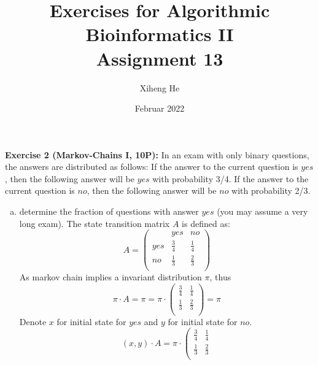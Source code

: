 \documentclass[12pt]{article}
\title{Exercises for Algorithmic Bioinformatics II\\
Assignment 13}
\author{Xiheng He}
\date{Februar 2022}
\begin{document}
{\let\newpage\relax\maketitle}
\begin{flushleft}
\textbf{Exercise 2 (Markov-Chains I, 10P):}
\newline
In an exam with only binary questions, the answers are distributed as follows:
If the answer to the current question is $yes$, then the following answer will be $yes$ with probability
3/4. If the answer to the current question is $no$, then the following answer will be $no$ with probability
2/3.
\begin{enumerate}[(a)]
    \item determine the fraction of questions with answer $yes$ (you may assume a very long exam).
    \newline
    The state transition matrix $A$ is defined as: 
    \begin{equation*}
        A = 
        \left(\begin{array}{ccc}
            & yes & no \\
            yes & \displaystyle\frac{3}{4} & \displaystyle\frac{1}{4} \\
            no & \displaystyle\frac{1}{3} & \displaystyle\frac{2}{3}  \\
        \end{array}\right)
    \end{equation*}
    As markov chain implies a invariant distribution $\pi$, thus
    \begin{equation*}
        \pi \cdot A = \pi = 
        \pi \cdot \left(\begin{array}{cc}
            \displaystyle\frac{3}{4} & \displaystyle\frac{1}{4} \\
            \displaystyle\frac{1}{3} & \displaystyle\frac{2}{3}  \\
        \end{array}\right) = \pi
    \end{equation*}
    Denote $x$ for initial state for $yes$ and $y$ for initial state for $no$.
    \begin{equation*}
        (x, y) \cdot A =
        \pi \cdot \left(\begin{array}{cc}
            \displaystyle\frac{3}{4} & \displaystyle\frac{1}{4} \\
            \displaystyle\frac{1}{3} & \displaystyle\frac{2}{3}  \\

\end{array}
\end{equation*}
\end{enumerate}
\end{flushleft}
\end{document}
